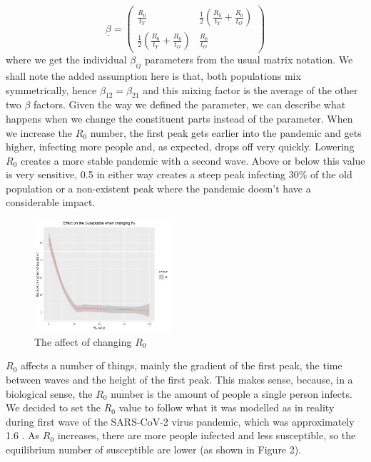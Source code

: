 \documentclass{article}
\begin{document}
$$ \underline{\beta} = \begin{pmatrix} 
  \frac{R_0}{t_Y} & \frac{1}{2}\left ( \frac{R_0}{t_Y} + \frac{R_0}{t_O} \right )\\
  \frac{1}{2}\left ( \frac{R_0}{t_Y} + \frac{R_0}{t_O} \right ) & \frac{R_0}{t_O}  
\end{pmatrix}
$$
where we get the individual $\beta_{ij}$ parameters from the usual matrix notation. We shall note the added assumption here is that, both populations mix symmetrically, hence $\beta_{12} = \beta_{21}$ and this mixing factor is the average of the other two $\beta$ factors. Given the way we defined the parameter, we can describe what happens when we change the constituent parts instead of the parameter. When we increase the $R_0$ number, the first peak gets earlier into the pandemic and gets higher, infecting more people and, as expected, drops off very quickly. Lowering $R_0$ creates a more stable pandemic with a second wave. Above or below this value is very sensitive, 0.5 in either way creates a steep peak infecting 30\% of the old population or a non-existent peak where the pandemic doesn't have a considerable impact.
\\
\newpage
\begin{figure}[ht!]
\begin{center}
      \includegraphics[width=0.45\textwidth]{./figures/MarioPlt/R0Sus.png}
      \end{center}
\caption{The affect of changing $R_0$}
\end{figure}

\noindent
$R_0$ affects a number of things, mainly the gradient of the first peak, the time between waves and the height of the first peak. This makes sense, because, in a biological sense, the $R_0$ number is the amount of people a single person infects. We decided to set the $R_0$ value to follow what it was modelled as in reality during first wave of the SARS-CoV-2 virus pandemic, which was approximately 1.6 \cite{reprodnumber}. As $R_0$ increases, there are more people infected and less susceptible, so the equilibrium number of susceptible are lower (as shown in Figure 2). \\
\end{document}
